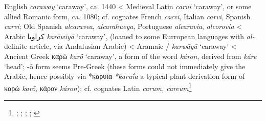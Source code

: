 \begin{etymology}\label{ety:caraway}
English \textit{caraway} `caraway', ca. 1440
< Medieval Latin \textit{carui} `caraway', or some allied Romanic form, ca. 1080; cf. cognates French \textit{carvi}, Italian \textit{carvi}, Spanish \textit{carvi}; Old Spanish \textit{alcaravea}, \textit{alcarahueya}, Portuguese \textit{alcaravia}, \textit{alcorovia}
< Arabic {كراويا} \textit{karāwiyā} `caraway', (loaned to some Eurropean languages with \textit{al-} definite article, via Andalusian Arabic)
< Aramaic {/} \textit{karwāyā} `caraway'
< Ancient Greek {καρώ} \textit{karṓ} `caraway', a form of the word \textit{káron}, derived from \textit{káre} `head'; -ṓ form seems Pre-Greek (these forms could not immediately give the Arabic, hence possibly via *καρυΐα \textit{*karuḯa} a typical plant derivation form of καρώ \textit{karṓ}, κάρον \textit{káron}); cf. cognates Latin \textit{carum, careum}\footnote{\textcite[caraway]{oed}; \textcite[caraway]{ahd}; \textcites[74]{corriente_dictionary_2008}[carvi]{tlfi}; \textcites[207]{low_aramaeische_1881}[437-438]{low_flora_1924}; \textcites[653]{beekes_etymological_2010}[599]{sokoloff_dictionary_2002}}
\end{etymology}